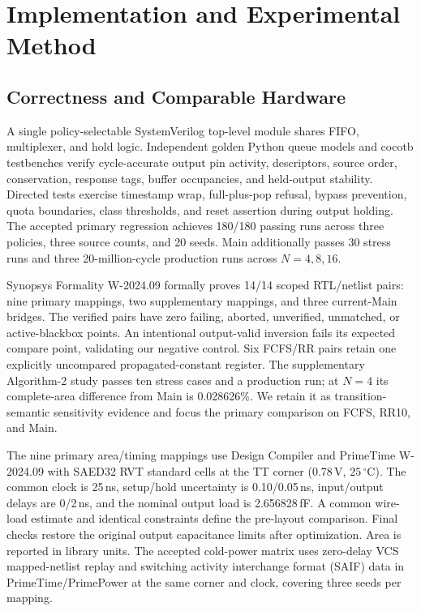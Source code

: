 \section{Implementation and Experimental Method}
\subsection{Correctness and Comparable Hardware}
A single policy-selectable SystemVerilog top-level module shares FIFO, multiplexer, and hold logic.
Independent golden Python queue models and cocotb testbenches verify cycle-accurate output pin activity,
descriptors, source order, conservation, response tags, buffer occupancies, and held-output stability.
Directed tests exercise timestamp wrap, full-plus-pop refusal, bypass prevention, quota
boundaries, class thresholds, and reset assertion during output holding. The accepted
primary regression achieves 180/180 passing runs across three policies, three source
counts, and 20 seeds. Main additionally passes 30 stress runs and three
20-million-cycle production runs across $N=4,8,16$.

Synopsys Formality W-2024.09 formally proves 14/14 scoped RTL/netlist pairs: nine primary
mappings, two supplementary mappings, and three current-Main bridges. The verified pairs
have zero failing, aborted, unverified, unmatched, or active-blackbox points.
An intentional output-valid inversion fails its expected compare point,
validating our negative control. Six FCFS/RR pairs retain one explicitly
uncompared propagated-constant register. The supplementary Algorithm-2 study
passes ten stress cases and a production run; at $N=4$ its complete-area
difference from Main is 0.028626\%. We retain it as transition-semantic
sensitivity evidence and focus the primary comparison on FCFS, RR10, and Main.

The nine primary area/timing mappings use Design Compiler and PrimeTime
W-2024.09 with SAED32 RVT standard cells at the TT corner (0.78\,V, $25\,{}^\circ$C).
The common clock is 25\,ns, setup/hold uncertainty is 0.10/0.05\,ns, input/output delays are
0/2\,ns, and the nominal output load is 2.656828\,fF. A common wire-load
estimate and identical constraints define the pre-layout comparison. Final
checks restore the original output capacitance limits after optimization.
Area is reported in library units. The accepted cold-power matrix uses
zero-delay VCS mapped-netlist replay and switching activity interchange format
(SAIF) data in PrimeTime/PrimePower
at the same corner and clock, covering three seeds per mapping.

